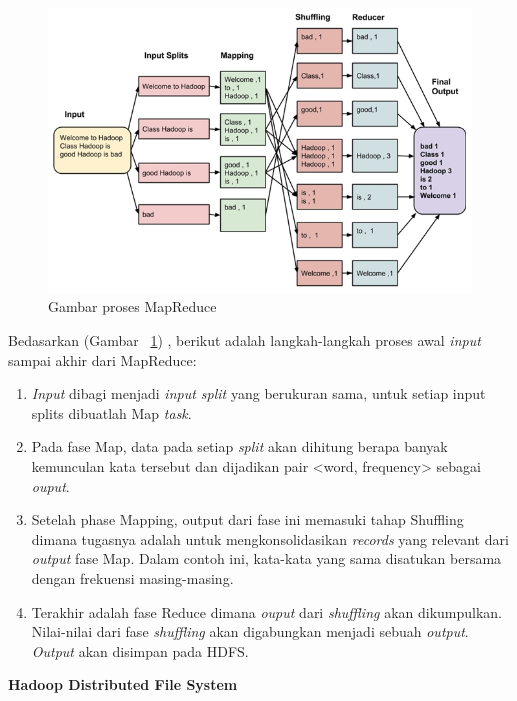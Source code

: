 \documentclass[a4paper,twoside]{article}
\begin{document}
\begin{enumerate}
\begin{figure}[H]
    \centering  
    \includegraphics[scale=1]{mpstep}  
    \caption[Gambar proses MapReduce]{Gambar proses MapReduce} 
    \label{fig:mpstep} 
\end{figure}

Bedasarkan (Gambar ~\ref{fig:mpstep}) , berikut adalah langkah-langkah proses awal \textit{input} sampai akhir dari MapReduce:

\begin{enumerate}
\item \textit{Input} dibagi menjadi {\it input split} yang berukuran sama, untuk setiap input splits dibuatlah Map {\it task}.

\item Pada fase Map, data pada setiap \textit{split} akan dihitung berapa banyak kemunculan kata tersebut dan dijadikan pair <word, frequency> sebagai \textit{ouput}.

\item Setelah phase Mapping, output dari fase ini memasuki tahap Shuffling dimana tugasnya adalah untuk mengkonsolidasikan {\it records} yang relevant dari \textit{output} fase Map. Dalam contoh ini, kata-kata yang sama disatukan bersama dengan frekuensi masing-masing.

\item Terakhir adalah fase Reduce dimana \textit{ouput} dari \textit{shuffling} akan dikumpulkan. Nilai-nilai dari fase \textit{shuffling} akan digabungkan menjadi sebuah \textit{output}. \textit{Output} akan disimpan pada HDFS.

\end{enumerate}


\textbf{Hadoop Distributed File System}\\


\end{enumerate}
\end{document}
